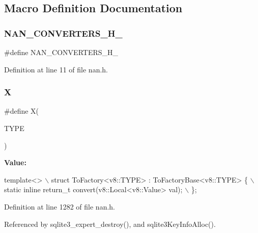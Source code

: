 \subsection{Macro Definition Documentation}
\mbox{\label{nan_8h_ab0f01f486e0cabae47538987abdce0aa}} 
\subsubsection{N\+A\+N\+\_\+\+C\+O\+N\+V\+E\+R\+T\+E\+R\+S\+\_\+\+H\+\_\+}
{\footnotesize\ttfamily \#define N\+A\+N\+\_\+\+C\+O\+N\+V\+E\+R\+T\+E\+R\+S\+\_\+\+H\+\_\+}



Definition at line 11 of file nan.\+h.

\mbox{\label{nan_8h_ad9853fca332475faf665e45daaff16ab}} 
\subsubsection{X\hspace{0.1cm}{\footnotesize\ttfamily [1/4]}}
{\footnotesize\ttfamily \#define X(\begin{DoxyParamCaption}\item[{}]{T\+Y\+PE }\end{DoxyParamCaption})}

{\bfseries Value\+:}
\begin{DoxyCode}
\textcolor{keyword}{template}<>                                                                 \(\backslash\)
    struct ToFactory<v8::TYPE> : ToFactoryBase<v8::TYPE> \{                     \(\backslash\)
      static \textcolor{keyword}{inline} return\_t convert(v8::Local<v8::Value> val);                \(\backslash\)
    \};
\end{DoxyCode}


Definition at line 1282 of file nan.\+h.



Referenced by sqlite3\+\_\+expert\+\_\+destroy(), and sqlite3\+Key\+Info\+Alloc().

\mbox{\label{nan__converters_8h_ad9853fca332475faf665e45daaff16ab}} 
